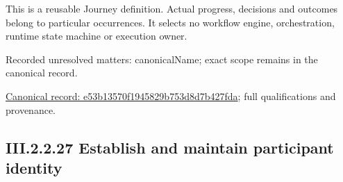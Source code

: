 This is a reusable Journey definition. Actual progress, decisions and outcomes belong to particular occurrences. It selects no workflow engine, orchestration, runtime state machine or execution owner.


{\small Recorded unresolved matters: canonicalName; exact scope remains in the canonical record.}\par
{\footnotesize \href{../../../../continuum/strategy/value-stream/e53b13570f1945829b753d8d7b427fda.md}{Canonical record: e53b13570f1945829b753d8d7b427fda}; full qualifications and provenance.}\par
\subsection*{III.2.2.27 Establish and maintain participant identity}
\label{navigation:III.2.2.27}

